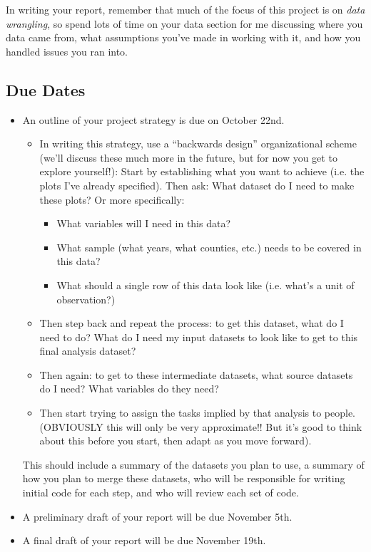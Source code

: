 \documentclass[12pt]{article}
\begin{document}
In writing your report, remember that much of the focus of this project is on \emph{data wrangling}, so spend lots of time on your data section for me discussing where you data came from, what assumptions you've made in working with it, and how you handled issues you ran into.

\subsection*{Due Dates}
\begin{itemize}
  \item An outline of your project strategy is due on October 22nd.
  \begin{itemize}
    \item In writing this strategy, use a ``backwards design'' organizational scheme (we'll discuss these much more in the future, but for now you get to explore yourself!): Start by establishing what you want to achieve (i.e. the plots I've already specified). Then ask: What dataset do I need to make these plots? Or more specifically:
    \begin{itemize}
      \item What variables will I need in this data?
      \item What sample (what years, what counties, etc.) needs to be covered in this data?
      \item What should a single row of this data look like (i.e. what's a unit of observation?)
    \end{itemize}
    \item Then step back and repeat the process: to get this dataset, what do I need to do? What do I need my input datasets to look like to get to this final analysis dataset?
    \item Then again: to get to these intermediate datasets, what source datasets do I need? What variables do they need?
    \item Then start trying to assign the tasks implied by that analysis to people. (OBVIOUSLY this will only be very approximate!! But it's good to think about this before you start, then adapt as you move forward).
  \end{itemize}
  This should include a summary of the datasets you plan to use, a summary of how you plan to merge these datasets, who will be responsible for writing initial code for each step, and who will review each set of code.
  \item A preliminary draft of your report will be due November 5th.
  \item A final draft of your report will be due November 19th.
\end{itemize}
\end{document}
